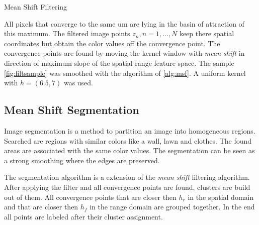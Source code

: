 \begin{algorithm2e}[H]
	\DontPrintSemicolon
	\BlankLine
	
	\BlankLine
	\BlankLine

	\caption{Mean Shift Filtering}
	\label{alg:msf}
\end{algorithm2e}


All pixels that converge to the same um are lying in the basin of
attraction of this maximum. The filtered image points $z_n, n = 1 ,
\ldots , N$ keep there spatial coordinates but obtain the color values
off the convergence point. The convergence points are found by moving
the kernel window with \emph{mean shift} in direction of maximum slope
of the spatial range feature space. The sample
\autoref{fig:filtsample} was smoothed with the algorithm of
\autoref{alg:msf}.  A uniform kernel with $h = (6.5, 7)$ was used.

\subsection{Mean Shift Segmentation} %
\label{sub:mean_shift_segmentation}
Image segmentation is a method to partition an image into homogeneous
regions.  Searched are regions with similar colors like a wall, lawn
and clothes.  The found areas are associated with the same color
values. The segmentation can be seen as a strong smoothing where the
edges are preserved.

The segmentation algorithm is a extension of the \emph{mean shift }
filtering algorithm. After applying the filter and all convergence
points are found, clusters are build out of them. All convergence
points that are closer then $h_r$ in the spatial domain and that are
closer then $h_f$ in the range domain are grouped together. In the end
all points are labeled after their cluster assignment.

